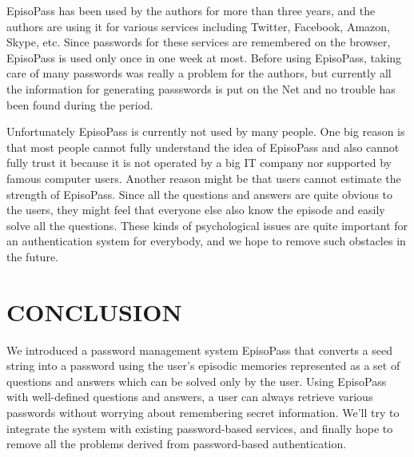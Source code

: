 \documentclass{sigchi}
\begin{document}
EpisoPass has been used by the authors for more than three years, and
the authors are using it for various services including
Twitter, Facebook, Amazon, Skype, etc.
Since passwords for these services are remembered on the browser,
EpisoPass is used only once in one week at most.
%
Before using EpisoPass, taking care of many passwords was really
a problem for the authors, but
currently all the information for generating passswords is put on the Net
and no trouble has been found during the period.

Unfortunately EpisoPass is currently not used by many people.
One big reason is that most people cannot fully understand the
idea of EpisoPass and also cannot fully trust it
because it is not operated by a big IT company nor supported by
famous computer users.
Another reason might be that users cannot estimate the strength
of EpisoPass.
Since all the questions and answers are
quite obvious to the users,
they might feel that everyone else also know the episode
and easily solve all the questions.
These kinds of psychological issues are quite important for
an authentication system for everybody,
and we hope to remove such obstacles in the future.

\section{CONCLUSION}

We introduced a password management system EpisoPass
that converts a seed string into a password using the user's
episodic memories represented as a set of questions and answers
which can be solved only by the user.
%
Using EpisoPass with well-defined questions and answers,
a user can always retrieve various passwords without worrying about
remembering secret information.
%
We'll try to integrate the system with existing password-based
services, and finally hope to remove all the problems
derived from password-based authentication.

%
%
\end{document}
